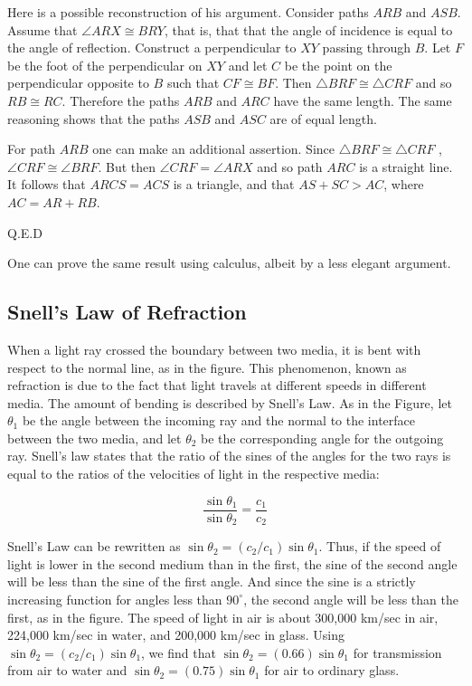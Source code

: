 Here is a possible reconstruction of his argument.  Consider 
paths $ARB$ and $ASB$.  Assume that 
$\angle ARX \cong BRY$, that is, that that the angle 
of incidence is equal to the angle of reflection.  Construct a perpendicular to $XY$ passing through $B$. Let 
$F$ be the foot of the perpendicular on $XY$ and let $C$ be the point on the perpendicular opposite to $B$ such that 
$CF \cong BF$. Then $\triangle BRF \cong \triangle CRF$ and so $RB \cong RC$.  Therefore the paths $ARB$ and $ARC$ have the same length.  The same reasoning shows that the paths $ASB$  and $ASC$ are of equal length.

For path $ARB$ one can make an additional assertion.
Since $\triangle BRF \cong \triangle CRF$ , $\angle CRF \cong \angle BRF$.
But then $\angle CRF = \angle ARX$ and so path $ARC$ is a 
straight line.  It follows that $ARCS = ACS$ is a triangle, and that $AS + SC > AC$, where $AC = AR + RB$.  

Q.E.D

One can prove the same result using calculus, albeit by a less elegant argument.


\subsection{Snell's Law of Refraction}

When a light ray crossed the boundary between two media, it is bent with respect to the normal line, as in the figure. This phenomenon, known as refraction is due to the fact that light travels at different speeds in different media.  The amount of bending is described by Snell's Law.  As in the Figure, let $\theta_1$ be the angle between the incoming ray and the normal to the interface between the two media, and let $\theta_2$ be the corresponding angle for the outgoing ray.  Snell's law states that the ratio of the sines of the angles for the two rays is equal to the ratios of the velocities of light in the respective media:


\begin{equation}
\frac{\sin \theta_1}{\sin \theta_2} = \frac{c_1}{c_2}
\end{equation}

 Snell's Law can be rewritten as
$\sin \theta_2 = (c_2/c_1) \sin \theta_1$.  Thus, if the speed of light is lower in the second medium than in the first, the sine of the second angle will be less than the sine of the first angle. And since the sine is a strictly increasing function for angles less than $90^\circ$, the second angle will be less than the first, as in the figure.
 The speed of light in air is about 300,000 km/sec in air, 224,000 km/sec in water, and 200,000 km/sec in glass.  Using 
$\sin\theta_2 = (c_2/c_1)\sin\theta_1$, we find that 
$\sin\theta_2 =( 0.66)\sin\theta_1$ for transmission 
from air to water and $\sin\theta_2 = (0.75)\sin\theta_1$ 
for air to ordinary glass.


